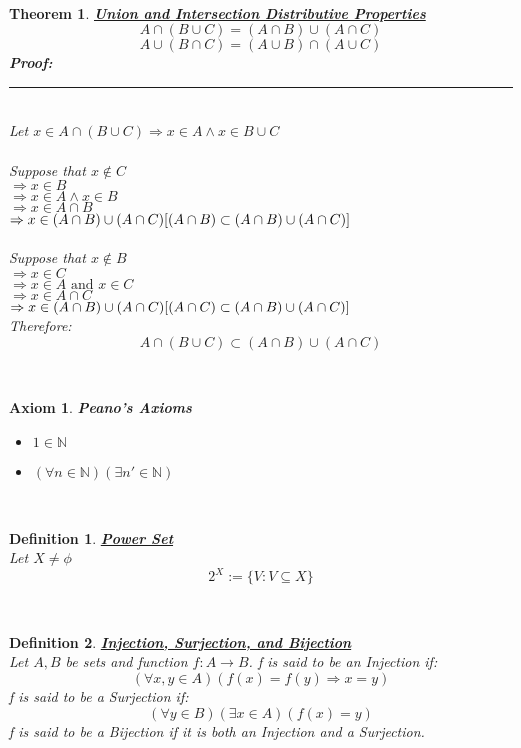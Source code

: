 \documentclass[12pt]{extarticle}
\theoremstyle{plain}
\newtheorem{thm}{Theorem}[section]
\theoremstyle{plain}
\newtheorem{axiom}{Axiom}[section]
\theoremstyle{plain}
\theoremstyle{Definition}
\newtheorem{def.}{Definition}[section]
\theoremstyle{Definition}
\theoremstyle{plain}
\theoremstyle{plain}
\newcommand{\cut}[0]{\noindent\framebox[\linewidth]{\rule{\linewidth}{2pt}}\\}
\newcommand{\prof}[0]{	\noindent \textbf{Proof:} \rule{500pt}{2pt} \\ }
\begin{document}
\cut
\begin{thm} \underline{\textbf{Union and Intersection Distributive Properties}} \\ 
	$$A \cap (B \cup C) = (A \cap B) \cup (A \cap C)$$ 	
	$$A \cup (B \cap C) = (A \cup B) \cap (A \cup C)$$
	\prof
	Let $x \in A \cap (B \cup C) \Rightarrow x \in A \land x \in B \cup C$ \\ \\
	Suppose that $x \not \in C$ \\
	$\Rightarrow x \in B$ \\ 
	$\Rightarrow x \in A \land x \in B$ \\ 
	$\Rightarrow x \in A \cap B$ \\ 
	$\Rightarrow x \in (A \cap B) \cup (A \cap C) \hfill [(A \cap B) \subset (A \cap B) \cup (A \cap C)]$ \\ \\
	Suppose that $x \not \in B$ \\
	$\Rightarrow x \in C$ \\ 
	$\Rightarrow x \in A \text{ and } x \in C$ \\ 
	$\Rightarrow x \in A \cap C$ \\ 
	$\Rightarrow x \in (A \cap B) \cup (A \cap C) \hfill [(A \cap C) \subset (A \cap B) \cup (A \cap C)]$ \\
	Therefore: \\ 
	$$A \cap (B \cup C) \subset (A \cap B) \cup (A \cap C)$$ 	
\end{thm}
\cut
\begin{axiom} \textbf{Peano's Axioms} \\
	\begin{itemize}
		\item $1 \in \mathbb{N}$ 
		\item $(\forall n \in \mathbb{N})(\exists n' \in \mathbb{N})$
	\end{itemize}
\end{axiom}
\cut
\begin{def.} \underline{\textbf{Power Set}} \\ 
	Let $X \not = \phi$ \\ 
	$$2^X := \{V : V \subseteq X\}$$
\end{def.}
\cut
\begin{def.} \underline{\textbf{Injection, Surjection, and Bijection}} \\
	Let $A,B$ be sets and  function $f : A \to B$.
	f is said to be an Injection if: \\ 
	$$(\forall x,y \in A)(f(x) = f(y) \Rightarrow x = y)$$
	f is said to be a Surjection if: \\ 
	$$(\forall y \in B)(\exists x \in A)(f(x) = y)$$
	f is said to be a Bijection if it is both an Injection and a Surjection.  
\end{def.}
\end{document}
